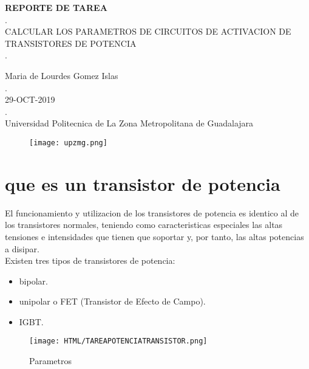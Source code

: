\documentclass[11pt,a4paper]{article}
\author{Maria de Lourdes Gomez}
\begin{document}
\begin{center}
\textbf{REPORTE DE TAREA}\\
.\\
CALCULAR LOS PARAMETROS DE CIRCUITOS DE ACTIVACION DE TRANSISTORES DE POTENCIA\\
.
\end{center}

\begin{center}
Maria de Lourdes Gomez Islas\\
.\\
29-OCT-2019\\
.\\
Universidad Politecnica de La Zona Metropolitana de Guadalajara
\end{center}

\begin{figure}[h]
\centering
\texttt{[image: upzmg.png]} 
\end{figure}

\newpage 

\part{que es un transistor de potencia}

El funcionamiento y utilizacion de los transistores de potencia es identico al de los transistores normales, teniendo como caracteristicas especiales las altas tensiones e intensidades que tienen que soportar y, por tanto, las altas potencias a disipar.\\
Existen tres tipos de transistores de potencia:\\

\begin{itemize}
\item bipolar.
\item unipolar o FET (Transistor de Efecto de Campo).
\item IGBT.
\end{itemize}

\begin{figure}[h]
\centering
\texttt{[image: HTML/TAREAPOTENCIATRANSISTOR.png]} 
\caption{Parametros}
\end{figure}
\end{document}
